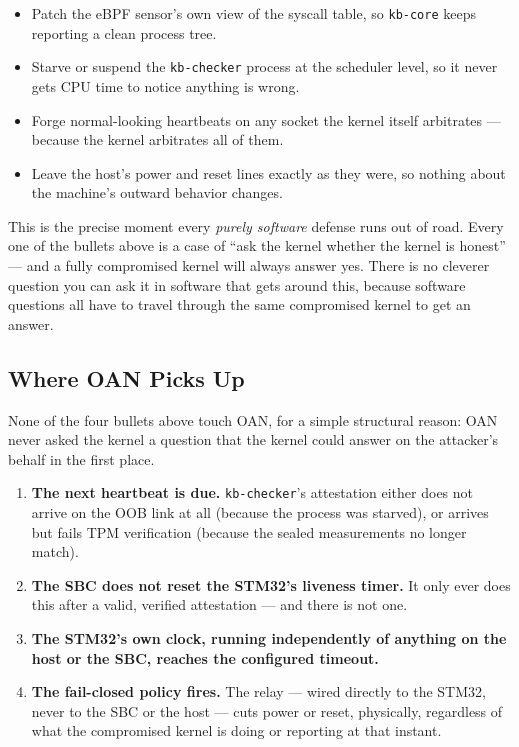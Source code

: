 \documentclass[11pt,a4paper]{article}
\begin{document}
\begin{itemize}
  \item Patch the eBPF sensor's own view of the syscall table, so
    \texttt{kb-core} keeps reporting a clean process tree.
  \item Starve or suspend the \texttt{kb-checker} process at the
    scheduler level, so it never gets CPU time to notice anything is
    wrong.
  \item Forge normal-looking heartbeats on any socket the kernel itself
    arbitrates --- because the kernel arbitrates all of them.
  \item Leave the host's power and reset lines exactly as they were, so
    nothing about the machine's outward behavior changes.
\end{itemize}

\begin{plainbox}
This is the precise moment every \emph{purely software} defense runs out
of road. Every one of the bullets above is a case of ``ask the kernel
whether the kernel is honest'' --- and a fully compromised kernel will
always answer yes. There is no cleverer question you can ask it in
software that gets around this, because software questions all have to
travel through the same compromised kernel to get an answer.
\end{plainbox}

\subsection{Where OAN Picks Up}

None of the four bullets above touch OAN, for a simple structural
reason: OAN never asked the kernel a question that the kernel could
answer on the attacker's behalf in the first place.

\begin{enumerate}
  \item \textbf{The next heartbeat is due.} \texttt{kb-checker}'s
    attestation either does not arrive on the OOB link at all (because
    the process was starved), or arrives but fails TPM verification
    (because the sealed measurements no longer match).
  \item \textbf{The SBC does not reset the STM32's liveness timer.} It
    only ever does this after a valid, verified attestation --- and
    there is not one.
  \item \textbf{The STM32's own clock, running independently of
    anything on the host or the SBC, reaches the configured timeout.}
  \item \textbf{The fail-closed policy fires.} The relay --- wired
    directly to the STM32, never to the SBC or the host --- cuts power
    or reset, physically, regardless of what the compromised kernel is
    doing or reporting at that instant.
\end{enumerate}
\end{document}
